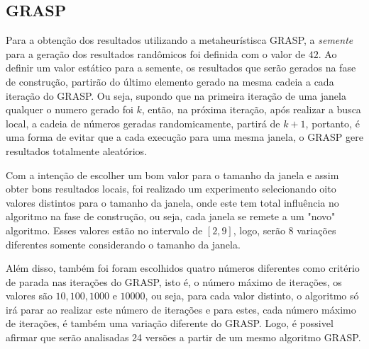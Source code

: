 \documentclass[a4paper, 12pt]{article}
\begin{document}
\subsection{GRASP}
Para a obtenção dos resultados utilizando a metaheurístisca GRASP, a \textit{semente} para a geração
dos resultados randômicos foi definida com o valor de $42$. Ao definir um valor estático para a semente, 
os resultados que serão gerados
na fase de construção, partirão do último elemento gerado na mesma cadeia a cada iteração do GRASP. Ou seja, supondo que na primeira
iteração de uma janela qualquer o numero gerado foi $k$, então, na próxima iteração, após realizar a busca local,
a cadeia de números geradas randomicamente, partirá de $k+1$, portanto, é uma forma de evitar
que a cada execução para uma mesma janela, o GRASP gere resultados totalmente aleatórios.

Com a intenção de escolher um bom valor para o tamanho da janela e assim obter bons resultados locais,
foi realizado um experimento selecionando oito valores distintos para o tamanho da janela, onde 
este tem total influência no algoritmo na fase de construção, ou seja, cada janela se remete a um "novo" algoritmo.
Esses valores estão no intervalo de $[2,9]$, logo, serão 8 variações diferentes somente considerando o tamanho da janela.



Além disso, também foi foram escolhidos quatro números diferentes
como critério de parada nas iterações do GRASP, isto é, o número máximo de iterações, os valores são
$10,100,1000$ e $10000$, ou seja, para cada valor distinto, o algoritmo só irá parar ao realizar este número de iterações e
para estes, cada número máximo de iterações, é também uma variação diferente do GRASP.
Logo, é possivel afirmar que serão analisadas 24 versões a partir de um mesmo algoritmo GRASP.

\end{document}
